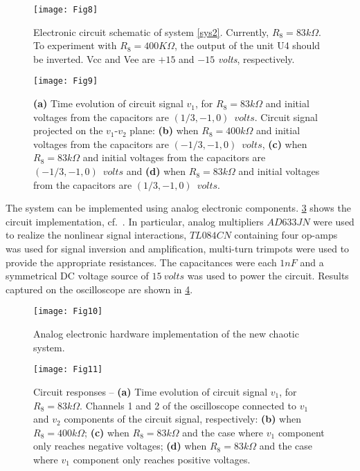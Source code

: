 \documentclass[final,5p,times,twocolumn]{elsarticle}
\begin{document}
\begin{figure}[h!]
	\texttt{[image: Fig8]}
	\caption{Electronic circuit schematic of system \eqref{sys2}. Currently, $R_8=83k\Omega$. To experiment with $R_8=400K\Omega$, the output of the unit U4 should be inverted. Vcc and Vee are $+15$ and $-15$ \textit{volts}, respectively.}
	\label{ecct}
\end{figure}
\begin{figure}[htbp]
	\texttt{[image: Fig9]}
	\caption{\textbf{(a)} Time evolution of circuit signal $v_1$, for $R_8 = 83k\Omega$ and initial voltages from the capacitors are $(1/3, -1,0)\enspace volts$. Circuit signal projected on the $v_1$-$v_2$ plane: \textbf{(b)} when $R_8=400k\Omega$ and initial voltages from the capacitors are $(-1/3,-1,0)\enspace volts$, \textbf{(c)} when $R_8=83k\Omega$ and initial voltages from the capacitors are $(-1/3,-1,0)\enspace volts$ and \textbf{(d)} when $R_8=83k\Omega$ and initial voltages from the capacitors are $(1/3, -1,0)\enspace volts$.}
	\label{psp1}
\end{figure}

The system can be implemented using analog electronic components. \cref{hwimp} shows the circuit implementation, cf.~\cite{nwachioma2019new}. In particular, analog multipliers $AD633JN$ were used to realize the nonlinear signal interactions, $TL084CN$ containing four op-amps was used for signal inversion and amplification, multi-turn trimpots were used to provide the appropriate resistances. The capacitances were each $1nF$ and a symmetrical DC voltage source of $15~volts$ was used to power the circuit. Results captured on the oscilloscope are shown in \cref{hwtesis}.
\begin{figure}[htbp]
	\texttt{[image: Fig10]}
	\caption{Analog electronic hardware implementation of the new chaotic system.}
	\label{hwimp}
\end{figure}
\begin{figure}[htbp]
	\texttt{[image: Fig11]}
	\caption{Circuit responses -- \textbf{(a)} Time evolution of circuit signal $v_1$, for $R_8 = 83k\Omega$. Channels 1 and 2 of the oscilloscope connected to $v_1$ and $v_2$ components of the circuit signal, respectively: \textbf{(b)} when $R_8=400k\Omega$; \textbf{(c)} when $R_8=83k\Omega$ and the case where $v_1$ component only reaches negative voltages; \textbf{(d)} when $R_8=83k\Omega$ and the case where $v_1$ component only reaches positive voltages.}
	\label{hwtesis}
\end{figure}
\end{document}
